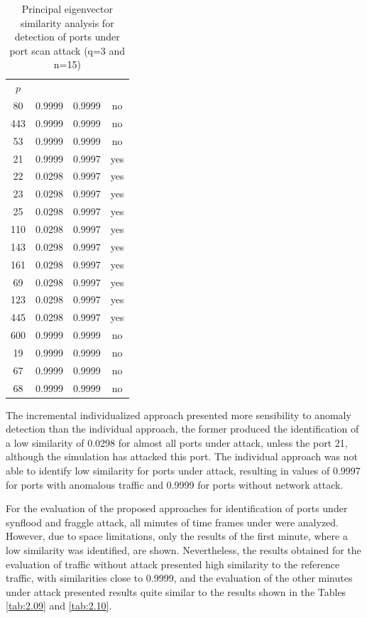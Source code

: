 \begin{table}[h!]
  \centering
  \footnotesize
  \caption{Principal eigenvector similarity analysis for detection of ports under port scan attack (q=3 and n=15)}
  \label{tab:2.08}
  \begin{tabular}{ c c c c }
	\toprule
	\multirow{2}{*}{\pmb{Port} $p$}   &\multicolumn{2}{c}{\pmb{Approaches}} &\multirow{2}{*}{\pmb{Ground Truth}}\\ 
			\hhline{~--~}
			&\pmb{Incremental Individualized} &\pmb{Individual}\\
	\midrule
	80 &0.9999 &0.9999 &no \\
	443 &0.9999 &0.9999 &no \\
	53 &0.9999 &0.9999 &no \\
	21 &0.9999 &0.9997 &yes \\
	22 &0.0298 &0.9997 &yes \\
	23 &0.0298 &0.9997 &yes \\
	25 &0.0298 &0.9997 &yes \\
	110 &0.0298 &0.9997 &yes \\
	143 &0.0298 &0.9997 &yes \\
	161 &0.0298 &0.9997 &yes \\
	69 &0.0298 &0.9997 &yes \\
	123 &0.0298 &0.9997 &yes \\
	445 &0.0298 &0.9997 &yes \\
	600 &0.9999 &0.9999 &no \\
	19 &0.9999 &0.9999 &no \\
	67 &0.9999 &0.9999 &no \\
	68 &0.9999 &0.9999 &no \\
    \bottomrule
  \end{tabular}
\end{table}

The incremental individualized approach presented more sensibility to anomaly detection than the individual approach, the former produced the identification of a low similarity of 0.0298 for almost all ports under attack, unless the port 21, although the simulation has attacked this port. The individual approach was not able to identify low similarity for ports under attack, resulting in values of 0.9997 for ports with anomalous traffic and 0.9999 for ports without network attack.

For the evaluation of the proposed approaches for identification of ports under synflood and fraggle attack, all minutes of time frames under were analyzed. However, due to space limitations, only the results of the first minute, where a low similarity was identified, are shown. Nevertheless, the results obtained for the evaluation of traffic without attack presented high similarity to the reference traffic, with similarities close to 0.9999, and the evaluation of the other minutes under attack presented results quite similar to the results shown in the Tables \ref{tab:2.09} and \ref{tab:2.10}.

